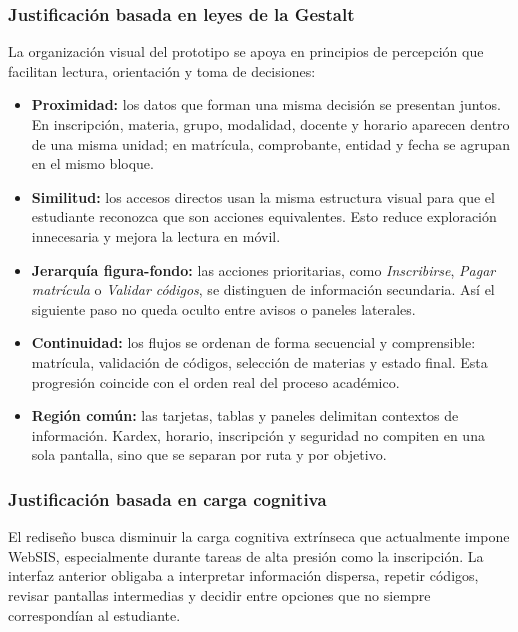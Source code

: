 \subsubsection*{Justificación basada en leyes de la Gestalt}

La organización visual del prototipo se apoya en principios de percepción que facilitan lectura, orientación y toma de decisiones:

\begin{itemize}
  \item \textbf{Proximidad:} los datos que forman una misma decisión se presentan juntos. En inscripción, materia, grupo, modalidad, docente y horario aparecen dentro de una misma unidad; en matrícula, comprobante, entidad y fecha se agrupan en el mismo bloque.
  \item \textbf{Similitud:} los accesos directos usan la misma estructura visual para que el estudiante reconozca que son acciones equivalentes. Esto reduce exploración innecesaria y mejora la lectura en móvil.
  \item \textbf{Jerarquía figura-fondo:} las acciones prioritarias, como \textit{Inscribirse}, \textit{Pagar matrícula} o \textit{Validar códigos}, se distinguen de información secundaria. Así el siguiente paso no queda oculto entre avisos o paneles laterales.
  \item \textbf{Continuidad:} los flujos se ordenan de forma secuencial y comprensible: matrícula, validación de códigos, selección de materias y estado final. Esta progresión coincide con el orden real del proceso académico.
  \item \textbf{Región común:} las tarjetas, tablas y paneles delimitan contextos de información. Kardex, horario, inscripción y seguridad no compiten en una sola pantalla, sino que se separan por ruta y por objetivo.
\end{itemize}

\subsubsection*{Justificación basada en carga cognitiva}

El rediseño busca disminuir la carga cognitiva extrínseca que actualmente impone WebSIS, especialmente durante tareas de alta presión como la inscripción. La interfaz anterior obligaba a interpretar información dispersa, repetir códigos, revisar pantallas intermedias y decidir entre opciones que no siempre correspondían al estudiante.

